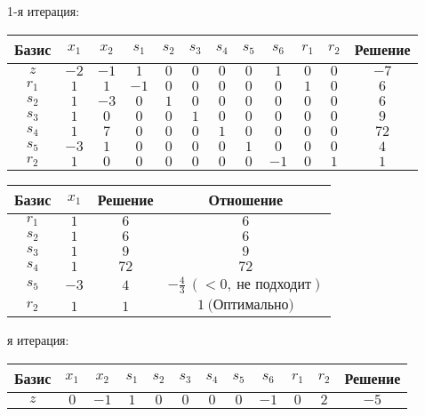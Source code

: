\documentclass{article}%
\begin{document}
\begin{flushleft}%
1{-}я итерация: %
\newline%
\newline%
\renewcommand{\arraystretch}{1.3}%
\begin{tabular}{|c|cccccccccc|c|}%
\hline%
Базис&$x_{1}$&$x_{2}$&$s_{1}$&$s_{2}$&$s_{3}$&$s_{4}$&$s_{5}$&$s_{6}$&$r_{1}$&$r_{2}$&Решение\\%
\hline%
$z$&$-2$&$-1$&$1$&$0$&$0$&$0$&$0$&$1$&$0$&$0$&$-7$\\%
\hline%
$r_{1}$&$1$&$1$&$-1$&$0$&$0$&$0$&$0$&$0$&$1$&$0$&$6$\\%
$s_{2}$&$1$&$-3$&$0$&$1$&$0$&$0$&$0$&$0$&$0$&$0$&$6$\\%
$s_{3}$&$1$&$0$&$0$&$0$&$1$&$0$&$0$&$0$&$0$&$0$&$9$\\%
$s_{4}$&$1$&$7$&$0$&$0$&$0$&$1$&$0$&$0$&$0$&$0$&$72$\\%
$s_{5}$&$-3$&$1$&$0$&$0$&$0$&$0$&$1$&$0$&$0$&$0$&$4$\\%
$r_{2}$&$1$&$0$&$0$&$0$&$0$&$0$&$0$&$-1$&$0$&$1$&$1$\\%
\hline%
\end{tabular}%
\newline%
\newline%
\newline%
\begin{tabular}{|cccc|}%
\hline%
Базис&$x_{1}$&Решение&Отношение\\%
\hline%
$r_{1}$&$1$&$6$&$6$\\%
$s_{2}$&$1$&$6$&$6$\\%
$s_{3}$&$1$&$9$&$9$\\%
$s_{4}$&$1$&$72$&$72$\\%
$s_{5}$&$-3$&$4$&$-\frac{4}{3}\: (< 0, \: \text{не подходит})$\\%
$r_{2}$&$1$&$1$&$1\: \text{(Оптимально)}$\\%
\hline%
\end{tabular}%
\newline%
\newline%
я итерация: %
\newline%
\newline%
\renewcommand{\arraystretch}{1.3}%
\begin{tabular}{|c|cccccccccc|c|}%
\hline%
Базис&$x_{1}$&$x_{2}$&$s_{1}$&$s_{2}$&$s_{3}$&$s_{4}$&$s_{5}$&$s_{6}$&$r_{1}$&$r_{2}$&Решение\\%
\hline%
$z$&$0$&$-1$&$1$&$0$&$0$&$0$&$0$&$-1$&$0$&$2$&$-5$\\%

\end{tabular}
\end{flushleft}
\end{document}
